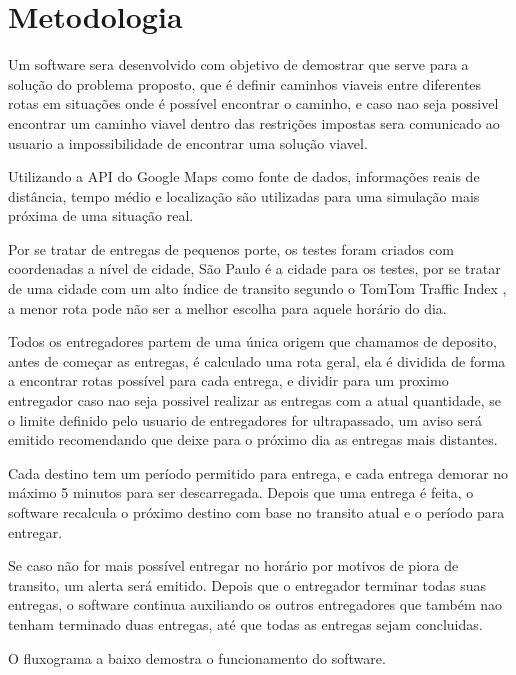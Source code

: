 \chapter{Metodologia}
Um software sera desenvolvido com objetivo de demostrar que serve para a solução do problema proposto, que é definir caminhos viaveis entre diferentes rotas em situações onde é possível encontrar o caminho, e caso nao seja possivel encontrar um caminho viavel dentro das restrições impostas sera comunicado ao usuario a impossibilidade de encontrar uma solução viavel.

Utilizando a API do Google Maps como fonte de dados, informações reais de distância, tempo médio e localização são utilizadas para uma simulação mais próxima de uma situação real.

Por se tratar de entregas de pequenos porte, os testes foram criados com coordenadas a nível de cidade, São Paulo é a cidade para os testes, por se tratar de uma cidade com um alto índice de transito segundo o TomTom Traffic Index \cite{TomTom}, a menor rota pode não ser a melhor escolha para aquele horário do dia.

Todos os entregadores partem de uma única origem que chamamos de deposito, antes de começar as entregas, é calculado uma rota geral, ela é dividida de forma a encontrar rotas possível para cada entrega, e dividir para um proximo entregador caso nao seja possivel realizar as entregas com a atual quantidade, se o limite definido pelo usuario de entregadores for ultrapassado, um aviso será emitido recomendando que deixe para o próximo dia as entregas mais distantes.

Cada destino tem um período permitido para entrega, e cada entrega demorar no máximo 5 minutos para ser descarregada. Depois que uma entrega é feita, o software recalcula o próximo destino com base no transito atual e o período para entregar.

Se caso não for mais possível entregar no horário por motivos de piora de transito, um alerta será emitido. Depois que o entregador terminar todas suas entregas, o software continua auxiliando os outros entregadores que também nao tenham terminado duas entregas, até que todas as entregas sejam concluidas.

O fluxograma a baixo demostra o funcionamento do software.

\begin{minipage}{\linewidth}
    \label{fig:FluxoSoftare}
\end{minipage}

